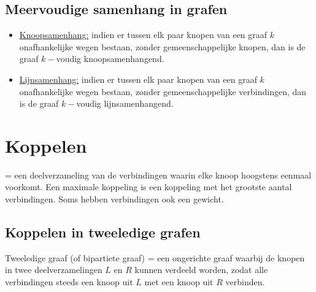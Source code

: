 \documentclass{report}
\begin{document}
\section{Meervoudige samenhang in grafen}
\begin{itemize}
	\item[\info] \underline{Knoopsamenhang:} indien er tussen elk paar knopen van een graaf $k$ onafhankelijke wegen bestaan, zonder gemeenschappelijke knopen, dan is de graaf $k-$voudig knoopsamenhangend.
	\item[\info] \underline{Lijnsamenhang:} indien er tussen elk paar knopen van een graaf $k$ onafhankelijke wegen bestaan, zonder gemeenschappelijke verbindingen, dan is de graaf $k-$voudig lijnsamenhangend.
\end{itemize}

\chapter{Koppelen}
= een deelverzameling van de verbindingen waarin elke knoop hoogstens eenmaal voorkomt. Een maximale koppeling is een koppeling met het grootste aantal verbindingen. Soms hebben verbindingen ook een gewicht.
\section{Koppelen in tweeledige grafen}
Tweeledige graaf (of bipartiete graaf) = een ongerichte graaf waarbij de knopen in twee deelverzamelingen $L$ en $R$ kunnen verdeeld worden, zodat alle verbindingen steeds een knoop uit $L$ met een knoop uit $R$ verbinden.
\end{document}
